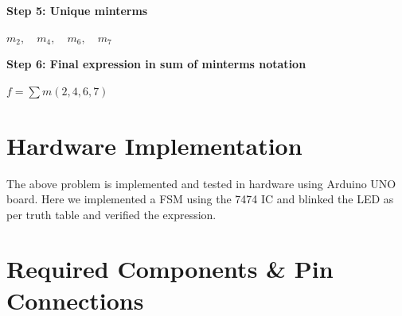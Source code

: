 \documentclass[a4paper,12pt]{article}
\begin{document}
\textbf{Step 5: Unique minterms}

$
m_2, \quad m_4, \quad m_6, \quad m_7
$

\textbf{Step 6: Final expression in sum of minterms notation}

$
f = \sum m(2, 4, 6, 7)
$

\section*{\textbf{Hardware Implementation}}
The above problem is implemented and tested in hardware using Arduino UNO board. Here we implemented a FSM using the 7474 IC and blinked the LED as per truth table and verified the expression.
\section*{Required Components \& Pin Connections}
\end{document}
